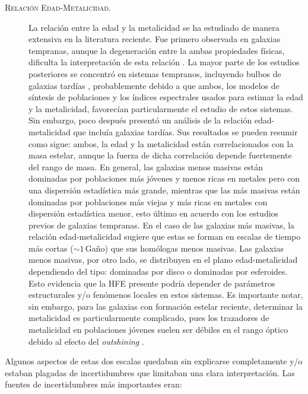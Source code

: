 \documentclass{article}
\begin{document}
\begin{description}
\item[\textsc{Relación Edad-Metalicidad.}] La relación entre la edad y la metalicidad se ha
estudiado de manera extensiva en la literatura reciente. Fue primero observada en galaxias
tempranas, aunque la degeneración entre la ambas propiedades físicas, dificulta la interpretación de
esta relación \citep{Worthey1994}. La mayor parte de los estudios posteriores se concentró en
sistemas tempranos, incluyendo bulbos de galaxias tardías \citep{Proctor2002, Terlevich2002},
probablemente debido a que ambos, los modelos de síntesis de poblaciones y los índices espectrales
usados para estimar la edad y la metalicidad, favorecían particularmente el estudio de estos
sistemas.
%
Sin embargo, poco después \citet{Gallazzi2005} presentó un análisis de la relación edad-metalicidad
que incluía galaxias tardías. Sus resultados se pueden resumir como sigue: ambos, la edad y la
metalicidad están correlacionados con la masa estelar, aunque la fuerza de dicha correlación depende
fuertemente del rango de masa. En general, las galaxias menos masivas están dominadas por
poblaciones más jóvenes y menos ricas en metales pero con una dispersión estadística más grande,
mientras que las más masivas están dominadas por poblaciones más viejas y más ricas en metales con
dispersión estadística menor, esto último en acuerdo con los estudios previos de galaxias tempranas.
En el caso de las galaxias más masivas, la relación edad-metalicidad sugiere que estas se forman en
escalas de tiempo más cortas ($\sim1\,$Gaño) que sus homólogas menos masivas.
Las galaxias menos masivas, por otro lado, se distribuyen en el plano edad-metalicidad dependiendo
del tipo: dominadas por disco o dominadas por esferoides. Esto evidencia que la HFE presente podría
depender de parámetros estructurales y/o fenómenos locales en estos sistemas.
Es importante notar, sin embargo, para las galaxias con formación estelar reciente, determinar la
metalicidad es particularmente complicado, pues los trazadores de metalicidad en poblaciones jóvenes
suelen ser débiles en el rango óptico debido al efecto del \emph{outshining}
\citep[e.\,g.,][]{Conroy2013a}.
%
\end{description}

Algunos aspectos de estas dos escalas quedaban sin explicarse completamente y/o estaban plagadas de
incertidumbres que limitaban una clara interpretación. Las fuentes de incertidumbres más importantes
eran:
\end{document}
